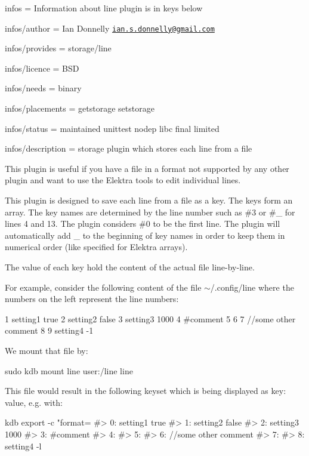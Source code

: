 
\begin{DoxyItemize}
\item infos = Information about line plugin is in keys below
\item infos/author = Ian Donnelly \href{mailto:ian.s.donnelly@gmail.com}{\tt ian.\+s.\+donnelly@gmail.\+com}
\item infos/provides = storage/line
\item infos/licence = B\+SD
\item infos/needs = binary
\item infos/placements = getstorage setstorage
\item infos/status = maintained unittest nodep libc final limited
\item infos/description = storage plugin which stores each line from a file
\end{DoxyItemize}

This plugin is useful if you have a file in a format not supported by any other plugin and want to use the Elektra tools to edit individual lines.

This plugin is designed to save each line from a file as a key. The keys form an array. The key names are determined by the line number such as {\ttfamily \#3} or {\ttfamily \#\+\_} for lines 4 and 13. The plugin considers {\ttfamily \#0} to be the first line. The plugin will automatically add {\ttfamily \+\_\+} to the beginning of key names in order to keep them in numerical order (like specified for Elektra arrays).

The value of each key hold the content of the actual file line-\/by-\/line.

For example, consider the following content of the file {\ttfamily $\sim$/.config/line} where the numbers on the left represent the line numbers\+:


\begin{DoxyCode}
1  setting1 true
2  setting2 false
3  setting3 1000
4  #comment
5
6
7  //some other comment
8
9  setting4 -1
\end{DoxyCode}


We mount that file by\+:


\begin{DoxyCode}
sudo kdb mount line user:/line line
\end{DoxyCode}


This file would result in the following keyset which is being displayed as {\ttfamily key\+: value}, e.\+g. with\+:


\begin{DoxyCode}
kdb export -c "format=%
#> 0: setting1 true
#> 1: setting2 false
#> 2: setting3 1000
#> 3: #comment
#> 4:
#> 5:
#> 6: //some other comment
#> 7:
#> 8: setting4 -l
\end{DoxyCode}


